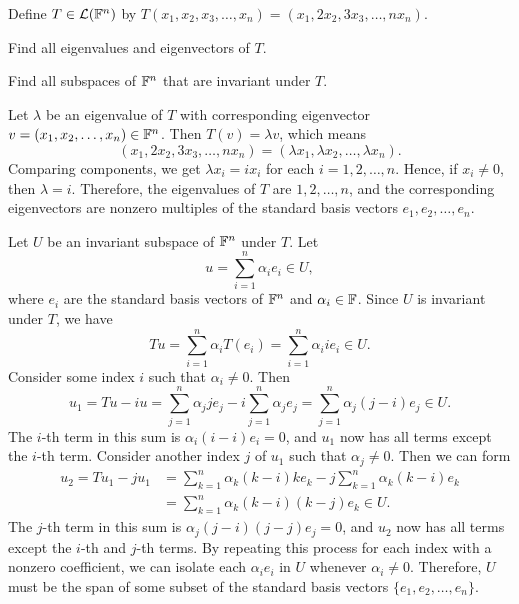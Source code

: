 \begin{exc}
\begin{exercise}
Define $T\in\mathcal{L}(\mathbb{F}^n)$ by
$T(x_1,x_2,x_3,\dots,x_n)=(x_1,2x_2,3x_3,\dots,nx_n)$.
\begin{parts}
\item Find all eigenvalues and eigenvectors of $T$.
\item Find all subspaces of $\mathbb{F}^n$ that are invariant under $T$.
\end{parts}
\end{exercise}
\begin{solution}
\begin{parts}
\item Let $\lambda$ be an eigenvalue of $T$ with corresponding eigenvector
  $v=(x_1,x_2,\dots,x_n)\in\mathbb{F}^n$. Then $T(v)=\lambda v$, which means
  \[ (x_1,2x_2,3x_3,\dots,nx_n) = (\lambda x_1,\lambda x_2,\dots,\lambda x_n).
  \]
  Comparing components, we get $\lambda x_i=ix_i$ for each $i=1,2,\dots,n$.
  Hence, if $x_i\ne0$, then $\lambda=i$. Therefore, the eigenvalues of $T$ are
  $1,2,\dots,n$, and the corresponding eigenvectors are nonzero multiples of
  the standard basis vectors $e_1,e_2,\dots,e_n$.
\item Let $U$ be an invariant subspace of $\mathbb{F}^n$ under $T$. Let
  \[ u = \sum_{i=1}^n\alpha_ie_i \in U, \]
  where $e_i$ are the standard basis vectors of $\mathbb{F}^n$ and $\alpha_i\in\mathbb{F}$.
  Since $U$ is invariant under $T$, we have
  \[ Tu = \sum_{i=1}^n\alpha_iT(e_i) = \sum_{i=1}^n\alpha_iie_i \in U. \]
  Consider some index $i$ such that $\alpha_i\ne0$. Then
  \[ u_1 = Tu-iu = \sum_{j=1}^n\alpha_jje_j-i\sum_{j=1}^n\alpha_je_j
     = \sum_{j=1}^n\alpha_j(j-i)e_j \in U. \]
  The $i$-th term in this sum is $\alpha_i(i-i)e_i=0$, and $u_1$ now has all
  terms except the $i$-th term. Consider another index $j$ of $u_1$ such that
  $\alpha_j\ne0$. Then we can form
  \begin{align*}
  u_2 = Tu_1-ju_1
    &= \sum_{k=1}^n\alpha_k(k-i)ke_k-j\sum_{k=1}^n\alpha_k(k-i)e_k\\
    &= \sum_{k=1}^n\alpha_k(k-i)(k-j)e_k \in U.
  \end{align*}
  The $j$-th term in this sum is $\alpha_j(j-i)(j-j)e_j=0$, and $u_2$ now has
  all terms except the $i$-th and $j$-th terms. By repeating this process for
  each index with a nonzero coefficient, we can isolate each $\alpha_ie_i$ in
  $U$ whenever $\alpha_i\ne0$. Therefore, $U$ must be the span of some subset
  of the standard basis vectors $\{e_1,e_2,\dots,e_n\}$.
\end{parts}


\end{solution}
\end{exc}
